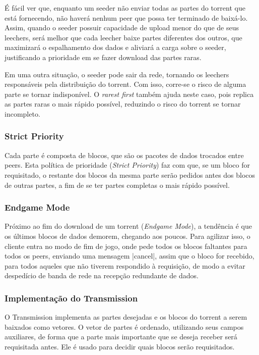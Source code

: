 É fácil ver que, enquanto um \gls*{seeder} não enviar todas as partes do \gls*{torrent}
que está fornecendo, não haverá nenhum \gls*{peer} que possa ter terminado de baixá-lo.
Assim, quando o \gls*{seeder} possuir capacidade de upload menor do que de seus
\glspl*{leecher}, será melhor que cada \gls*{leecher} baixe partes diferentes dos
outros, que maximizará o espalhamento dos dados e aliviará a carga sobre o \gls*{seeder},
justificando a prioridade em se fazer download das partes raras.

Em uma outra situação, o \gls*{seeder} pode sair da rede, tornando os \glspl*{leecher}
responsáveis pela distribuição do \gls*{torrent}. Com isso, corre-se o risco de alguma
parte se tornar indisponível. O \emph{rarest first} também ajuda neste caso, pois
replica as partes raras o mais rápido possível, reduzindo o risco do \gls*{torrent} se
tornar incompleto.

\subsubsection*{Strict Priority}

Cada parte é composta de blocos, que são os pacotes de dados trocados entre
\glspl*{peer}. Esta política de prioridade (\emph{Strict Priority}) faz com que, se um
bloco for requisitado, o restante dos blocos da mesma parte serão pedidos antes dos
blocos de outras partes, a fim de se ter partes completas o mais rápido possível.

\subsubsection*{Endgame Mode}
\label{subsubsec:endgame}

Próximo ao fim do download de um \gls*{torrent} (\emph{Endgame Mode}), a tendência é
que os últimos blocos de dados demorem, chegando aos poucos. Para agilizar isso, o
cliente entra no modo de fim de jogo, onde pede todos os blocos faltantes para todos os
\glspl*{peer}, enviando uma mensagem \bverb|cancel|, assim que o bloco for recebido,
para todos aqueles que não tiverem respondido à requisição, de modo a evitar despedício
de banda de rede na recepção redundante de dados.

\subsubsection*{Implementação do Transmission}

O Transmission implementa as partes desejadas e os blocos do \gls*{torrent} a serem
baixados como vetores. O vetor de partes é ordenado, utilizando seus campos auxiliares,
de forma que a parte mais importante que se deseja receber será requisitada antes. Ele
é usado para decidir quais blocos serão requisitados.

